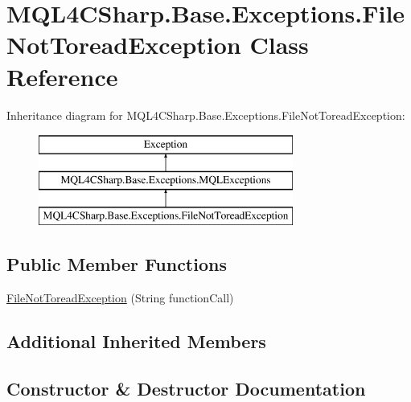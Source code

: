 \hypertarget{class_m_q_l4_c_sharp_1_1_base_1_1_exceptions_1_1_file_not_toread_exception}{}\section{M\+Q\+L4\+C\+Sharp.\+Base.\+Exceptions.\+File\+Not\+Toread\+Exception Class Reference}
\label{class_m_q_l4_c_sharp_1_1_base_1_1_exceptions_1_1_file_not_toread_exception}
Inheritance diagram for M\+Q\+L4\+C\+Sharp.\+Base.\+Exceptions.\+File\+Not\+Toread\+Exception\+:\begin{figure}[H]
\begin{center}
\leavevmode
\includegraphics[height=3.000000cm]{class_m_q_l4_c_sharp_1_1_base_1_1_exceptions_1_1_file_not_toread_exception}
\end{center}
\end{figure}
\subsection*{Public Member Functions}
\begin{DoxyCompactItemize}
\item 
\hyperlink{class_m_q_l4_c_sharp_1_1_base_1_1_exceptions_1_1_file_not_toread_exception_a0c352983f3e2dac303d42a11d3d03f01}{File\+Not\+Toread\+Exception} (String function\+Call)
\end{DoxyCompactItemize}
\subsection*{Additional Inherited Members}


\subsection{Constructor \& Destructor Documentation}
